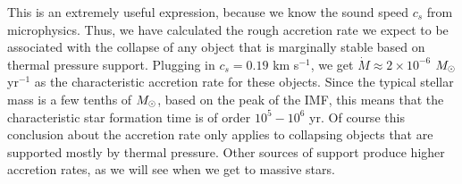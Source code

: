This is an extremely useful expression, because we know the sound speed $c_s$ from microphysics. Thus, we have calculated the rough accretion rate we expect to be associated with the collapse of any object that is marginally stable based on thermal pressure support. Plugging in $c_s=0.19$ km s$^{-1}$, we get $\dot{M} \approx 2\times 10^{-6}$ $M_{\odot}$ yr$^{-1}$ as the characteristic accretion rate for these objects. Since the typical stellar mass is a few tenths of $M_{\odot}$, based on the peak of the IMF, this means that the characteristic star formation time is of order $10^5-10^6$ yr. Of course this conclusion about the accretion rate only applies to collapsing objects that are supported mostly by thermal pressure. Other sources of support produce higher accretion rates, as we will see when we get to massive stars.


